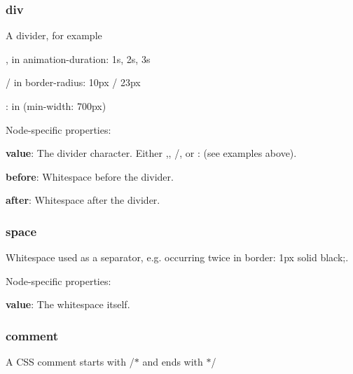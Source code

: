 {\ttfamily \subsubsection*{div}}

{\ttfamily }

{\ttfamily A divider, for example}

{\ttfamily 
\begin{DoxyItemize}
\item {\ttfamily ,} in {\ttfamily animation-\/duration\+: 1s, 2s, 3s}
\item {\ttfamily /} in {\ttfamily border-\/radius\+: 10px / 23px}
\item {\ttfamily \+:} in {\ttfamily (min-\/width\+: 700px)}
\end{DoxyItemize}}

{\ttfamily Node-\/specific properties\+:}

{\ttfamily 
\begin{DoxyItemize}
\item {\bfseries value}\+: The divider character. Either {\ttfamily ,}, {\ttfamily /}, or {\ttfamily \+:} (see examples above).
\item {\bfseries before}\+: Whitespace before the divider.
\item {\bfseries after}\+: Whitespace after the divider.
\end{DoxyItemize}}

{\ttfamily \subsubsection*{space}}

{\ttfamily }

{\ttfamily Whitespace used as a separator, e.\+g. occurring twice in {\ttfamily border\+: 1px solid black;}.}

{\ttfamily Node-\/specific properties\+:}

{\ttfamily 
\begin{DoxyItemize}
\item {\bfseries value}\+: The whitespace itself.
\end{DoxyItemize}}

{\ttfamily \subsubsection*{comment}}

{\ttfamily }

{\ttfamily A C\+SS comment starts with {\ttfamily /$\ast$} and ends with {\ttfamily $\ast$/}}

